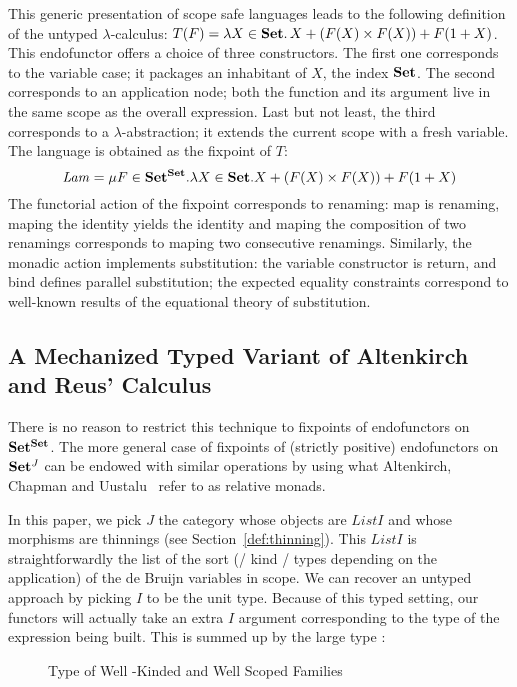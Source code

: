 This generic presentation of scope safe languages leads to the following
definition of the untyped $\lambda$-calculus:
$T(F) = \lambda X \in \mathbf{Set}{}.\, X + (F(X) \times F(X)) + F(1 + X)$.
This endofunctor offers a choice of three constructors.
The first one corresponds to the variable
case; it packages an inhabitant of $X$, the index $\mathbf{Set}{}$. The second corresponds
to an application node; both the function and its argument live in the same
scope as the overall expression. Last but not least, the third corresponds to
a $\lambda$-abstraction; it extends the current scope with a fresh variable.
The language is obtained as the fixpoint of $T$:
\[
   \mathit{Lam} = \mu F \in \mathbf{Set}{}^{\mathbf{Set}{}}.
   \lambda X \in \mathbf{Set}{}. X + (F(X) \times F(X)) + F(1 + X)
\]
The functorial action of the fixpoint corresponds to renaming: map is renaming,
maping the identity yields the identity and maping the composition of two
renamings corresponds to maping two consecutive renamings. Similarly, the monadic
action implements substitution: the variable constructor is return, and bind defines
parallel substitution; the expected equality constraints correspond to well-known
results of the equational theory of substitution.

\subsection{A Mechanized Typed Variant of Altenkirch and Reus' Calculus}

There is no reason to restrict this technique to fixpoints of endofunctors
on $\mathbf{Set}{}^{\mathbf{Set}{}}$. The more general
case of fixpoints of (strictly positive) endofunctors on $\mathbf{Set}{}^J$ can be
endowed with similar operations by using what Altenkirch, Chapman and
Uustalu~\citeyear{Altenkirch2010, JFR4389} refer to as relative monads.

In this paper, we pick $J$ the category whose objects are $\mathit{List} I$ and whose
morphisms are thinnings (see Section~\ref{def:thinning}). This $\mathit{List} I$ is straightforwardly the list
of the sort (/ kind / types depending on the application) of the de Bruijn variables
in scope. We can recover an untyped approach by picking $I$ to be the unit type.
Because of this typed setting, our functors will actually take an extra $I$ argument
corresponding to the type of the expression being built. This is summed up by
the large type :

\begin{figure}[h]
\caption{Type of Well -Kinded and Well Scoped Families}
\end{figure}

